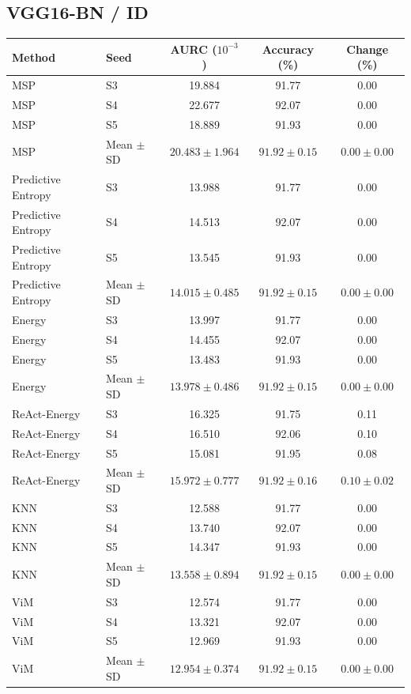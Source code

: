 \subsection*{VGG16-BN / ID}
\begingroup
\footnotesize
\setlength{\tabcolsep}{3pt}
\renewcommand{\arraystretch}{1.1}
\begin{longtable}{@{}llccc@{}}
\toprule
Method & Seed & AURC ($10^{-3}$) & Accuracy (\%) & Change (\%) \\
\midrule
\endhead
\bottomrule
\endlastfoot
MSP & S3 & 19.884 & 91.77 & 0.00 \\
MSP & S4 & 22.677 & 92.07 & 0.00 \\
MSP & S5 & 18.889 & 91.93 & 0.00 \\
MSP & Mean $\pm$ SD & $20.483 \pm 1.964$ & $91.92 \pm 0.15$ & $0.00 \pm 0.00$ \\
Predictive Entropy & S3 & 13.988 & 91.77 & 0.00 \\
Predictive Entropy & S4 & 14.513 & 92.07 & 0.00 \\
Predictive Entropy & S5 & 13.545 & 91.93 & 0.00 \\
Predictive Entropy & Mean $\pm$ SD & $14.015 \pm 0.485$ & $91.92 \pm 0.15$ & $0.00 \pm 0.00$ \\
Energy & S3 & 13.997 & 91.77 & 0.00 \\
Energy & S4 & 14.455 & 92.07 & 0.00 \\
Energy & S5 & 13.483 & 91.93 & 0.00 \\
Energy & Mean $\pm$ SD & $13.978 \pm 0.486$ & $91.92 \pm 0.15$ & $0.00 \pm 0.00$ \\
ReAct-Energy & S3 & 16.325 & 91.75 & 0.11 \\
ReAct-Energy & S4 & 16.510 & 92.06 & 0.10 \\
ReAct-Energy & S5 & 15.081 & 91.95 & 0.08 \\
ReAct-Energy & Mean $\pm$ SD & $15.972 \pm 0.777$ & $91.92 \pm 0.16$ & $0.10 \pm 0.02$ \\
KNN & S3 & 12.588 & 91.77 & 0.00 \\
KNN & S4 & 13.740 & 92.07 & 0.00 \\
KNN & S5 & 14.347 & 91.93 & 0.00 \\
KNN & Mean $\pm$ SD & $13.558 \pm 0.894$ & $91.92 \pm 0.15$ & $0.00 \pm 0.00$ \\
ViM & S3 & 12.574 & 91.77 & 0.00 \\
ViM & S4 & 13.321 & 92.07 & 0.00 \\
ViM & S5 & 12.969 & 91.93 & 0.00 \\
ViM & Mean $\pm$ SD & $12.954 \pm 0.374$ & $91.92 \pm 0.15$ & $0.00 \pm 0.00$ \\

\end{longtable}
